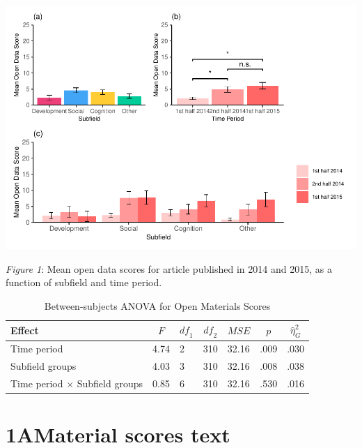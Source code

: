 \documentclass[
  english,
  man]{apa6}
\begin{document}
\includegraphics{icd_special_issue_files/figure-latex/1A-d-plots-1.pdf}

\emph{Figure 1}: Mean open data scores for article published in 2014 and 2015, as a function of subfield and time period.

\begin{table}[tbp]

\begin{center}
\begin{threeparttable}

\caption{\label{tab:1A-m-anova}Between-subjects ANOVA for Open Materials Scores}

\begin{tabular}{lllllll}
\toprule
Effect & \multicolumn{1}{c}{$F$} & \multicolumn{1}{c}{$\mathit{df}_1$} & \multicolumn{1}{c}{$\mathit{df}_2$} & \multicolumn{1}{c}{$\mathit{MSE}$} & \multicolumn{1}{c}{$p$} & \multicolumn{1}{c}{$\hat{\eta}^2_G$}\\
\midrule
Time period & 4.74 & 2 & 310 & 32.16 & .009 & .030\\
Subfield groups & 4.03 & 3 & 310 & 32.16 & .008 & .038\\
Time period $\times$ Subfield groups & 0.85 & 6 & 310 & 32.16 & .530 & .016\\
\bottomrule
\end{tabular}

\end{threeparttable}
\end{center}

\end{table}

\hypertarget{amaterial-scores-text}{%
\section{1AMaterial scores text}\label{amaterial-scores-text}}
\end{document}
